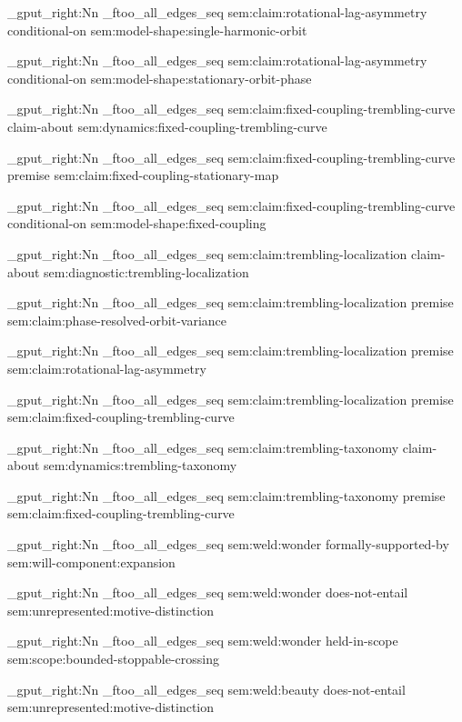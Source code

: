 \seq_gput_right:Nn \g_ftoo_all_edges_seq { { sem:claim:rotational-lag-asymmetry } { conditional-on } { sem:model-shape:single-harmonic-orbit } }

\seq_gput_right:Nn \g_ftoo_all_edges_seq { { sem:claim:rotational-lag-asymmetry } { conditional-on } { sem:model-shape:stationary-orbit-phase } }

\seq_gput_right:Nn \g_ftoo_all_edges_seq { { sem:claim:fixed-coupling-trembling-curve } { claim-about } { sem:dynamics:fixed-coupling-trembling-curve } }

\seq_gput_right:Nn \g_ftoo_all_edges_seq { { sem:claim:fixed-coupling-trembling-curve } { premise } { sem:claim:fixed-coupling-stationary-map } }

\seq_gput_right:Nn \g_ftoo_all_edges_seq { { sem:claim:fixed-coupling-trembling-curve } { conditional-on } { sem:model-shape:fixed-coupling } }

\seq_gput_right:Nn \g_ftoo_all_edges_seq { { sem:claim:trembling-localization } { claim-about } { sem:diagnostic:trembling-localization } }

\seq_gput_right:Nn \g_ftoo_all_edges_seq { { sem:claim:trembling-localization } { premise } { sem:claim:phase-resolved-orbit-variance } }

\seq_gput_right:Nn \g_ftoo_all_edges_seq { { sem:claim:trembling-localization } { premise } { sem:claim:rotational-lag-asymmetry } }

\seq_gput_right:Nn \g_ftoo_all_edges_seq { { sem:claim:trembling-localization } { premise } { sem:claim:fixed-coupling-trembling-curve } }

\seq_gput_right:Nn \g_ftoo_all_edges_seq { { sem:claim:trembling-taxonomy } { claim-about } { sem:dynamics:trembling-taxonomy } }

\seq_gput_right:Nn \g_ftoo_all_edges_seq { { sem:claim:trembling-taxonomy } { premise } { sem:claim:fixed-coupling-trembling-curve } }

\seq_gput_right:Nn \g_ftoo_all_edges_seq { { sem:weld:wonder } { formally-supported-by } { sem:will-component:expansion } }

\seq_gput_right:Nn \g_ftoo_all_edges_seq { { sem:weld:wonder } { does-not-entail } { sem:unrepresented:motive-distinction } }

\seq_gput_right:Nn \g_ftoo_all_edges_seq { { sem:weld:wonder } { held-in-scope } { sem:scope:bounded-stoppable-crossing } }

\seq_gput_right:Nn \g_ftoo_all_edges_seq { { sem:weld:beauty } { does-not-entail } { sem:unrepresented:motive-distinction } }

